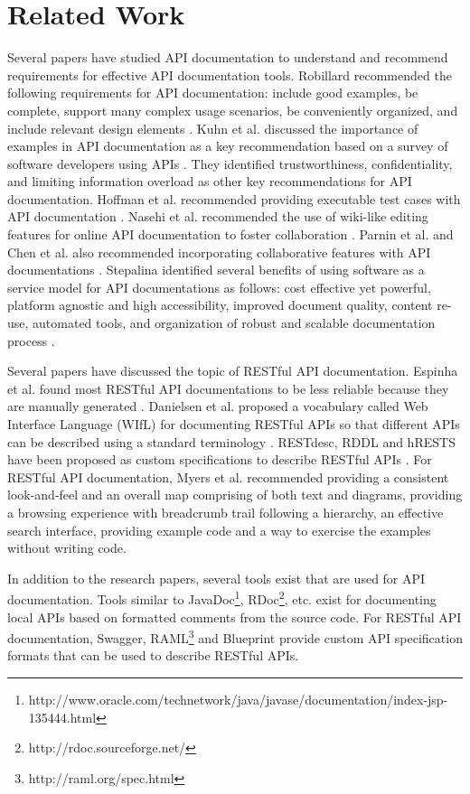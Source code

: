 \documentclass[conference]{IEEEtran}
\begin{document}
\section{Related Work}
Several papers have studied API documentation to understand and recommend requirements for effective API documentation tools. Robillard recommended the following requirements for API documentation: include good examples, be complete, support many complex usage scenarios, be conveniently organized, and include relevant design elements \cite{Robillard_what_makes, Robillard_a_field_study}. Kuhn et al. discussed the importance of examples in API documentation as a key recommendation based on a survey of software developers using APIs \cite{Kuhn_on_designing}. They identified trustworthiness, confidentiality, and limiting information overload as other key recommendations for API documentation. Hoffman et al. recommended providing executable test cases with API documentation \cite{Hoffman_api_documentation}. Nasehi et al. recommended the use of wiki-like editing features for online API documentation to foster collaboration \cite{Nasehi_what_makes}. Parnin et al. and Chen et al. also recommended incorporating collaborative features with API documentations \cite{Parnin_measuring, Chen_who_asked}. Stepalina identified several benefits of using software as a service model for API documentations as follows: cost effective yet powerful, platform agnostic and high accessibility, improved document quality, content re-use, automated tools, and organization of robust and scalable documentation process \cite{Stepalina_saas}.

Several papers have discussed the topic of RESTful API documentation. Espinha et al. found most RESTful API documentations to be less reliable because they are manually generated \cite{Espinha_web}. Danielsen et al. proposed a vocabulary called Web Interface Language (WIfL) for documenting RESTful APIs so that different APIs can be described using a standard terminology \cite{Danielsen_validation}. RESTdesc, RDDL and hRESTS have been proposed as custom specifications to describe RESTful APIs \cite{Verborgh_functional, Mangler_rddl, Kopecky_hrests}. For RESTful API documentation, Myers et al. recommended providing a consistent look-and-feel and an overall map comprising of both text and diagrams, providing a browsing experience with breadcrumb trail following a hierarchy, an effective search interface, providing example code and a way to exercise the examples without writing code.

In addition to the research papers, several tools exist that are used for API documentation. Tools similar to JavaDoc\footnote{http://www.oracle.com/technetwork/java/javase/documentation/index-jsp-135444.html}, RDoc\footnote{http://rdoc.sourceforge.net/}, etc. exist for documenting local APIs based on formatted comments from the source code. For RESTful API documentation, Swagger, RAML\footnote{http://raml.org/spec.html} and Blueprint provide custom API specification formats that can be used to describe RESTful APIs.
\end{document}
